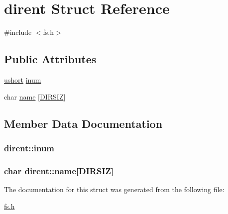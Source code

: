 \hypertarget{structdirent}{}\section{dirent Struct Reference}
\label{structdirent}


{\ttfamily \#include $<$fs.\+h$>$}

\subsection*{Public Attributes}
\begin{DoxyCompactItemize}
\item 
\hyperlink{custom__types_8h_ab95f123a6c9bcfee6a343170ef8c5f69}{ushort} \hyperlink{structdirent_a68698c303a46d2a34232a2226629ac79}{inum}
\item 
char \hyperlink{structdirent_a4e08a84dbac9b9f6a3e006151855d14d}{name} \mbox{[}\hyperlink{fs_8h_a48246fb9e5cb7f6a71ebc9ebc2f06562}{D\+I\+R\+S\+IZ}\mbox{]}
\end{DoxyCompactItemize}


\subsection{Member Data Documentation}
\subsubsection[{\texorpdfstring{inum}{inum}}]{ dirent\+::inum}\hypertarget{structdirent_a68698c303a46d2a34232a2226629ac79}{}\label{structdirent_a68698c303a46d2a34232a2226629ac79}
\subsubsection[{\texorpdfstring{name}{name}}]{\setlength{\rightskip}{0pt plus 5cm}char dirent\+::name\mbox{[}{\bf D\+I\+R\+S\+IZ}\mbox{]}}\hypertarget{structdirent_a4e08a84dbac9b9f6a3e006151855d14d}{}\label{structdirent_a4e08a84dbac9b9f6a3e006151855d14d}


The documentation for this struct was generated from the following file\+:\begin{DoxyCompactItemize}
\item 
\hyperlink{fs_8h}{fs.\+h}\end{DoxyCompactItemize}
